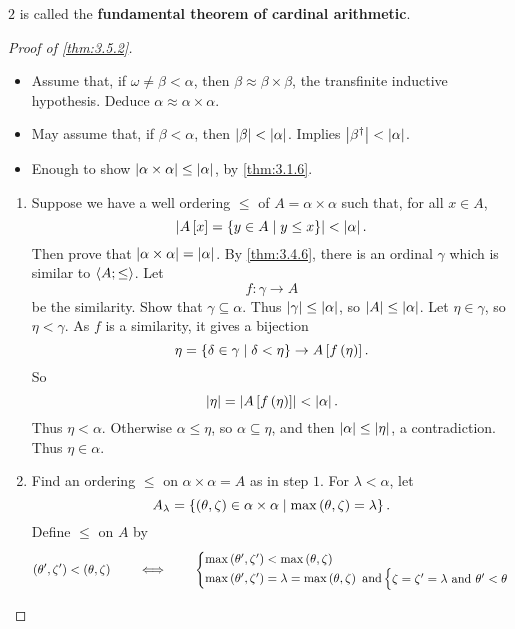 $ 2 $ is called the \textbf{fundamental theorem of cardinal arithmetic}.


\begin{proof}[Proof of \ref{thm:3.5.2}]
\hfill
\begin{itemize}
\item Assume that, if $ \omega \ne \beta < \alpha $, then $ \beta \approx \beta \times \beta $, the transfinite inductive hypothesis. Deduce $ \alpha \approx \alpha \times \alpha $.
\item May assume that, if $ \beta < \alpha $, then $ \abs{\beta} < \abs{\alpha} $. Implies $ \abs{\beta^\dagger} < \abs{\alpha} $.
\item Enough to show $ \abs{\alpha \times \alpha} \le \abs{\alpha} $, by \ref{thm:3.1.6}.
\end{itemize}
\begin{enumerate}[leftmargin=0.5in, label=Step \arabic*.]
\item Suppose we have a well ordering $ \le $ of $ A = \alpha \times \alpha $ such that, for all $ x \in A $,
$$ \abs{A\sb{x} = \cb{y \in A \mid y \le x}} < \abs{\alpha}. $$
Then prove that $ \abs{\alpha \times \alpha} = \abs{\alpha} $. By \ref{thm:3.4.6}, there is an ordinal $ \gamma $ which is similar to $ \ab{A; \le} $. Let
$$ f : \gamma \to A $$
be the similarity. Show that $ \gamma \subseteq \alpha $. Thus $ \abs{\gamma} \le \abs{\alpha} $, so $ \abs{A} \le \abs{\alpha} $. Let $ \eta \in \gamma $, so $ \eta < \gamma $. As $ f $ is a similarity, it gives a bijection
$$ \eta = \cb{\delta \in \gamma \mid \delta < \eta} \to A\sb{f\rb{\eta}}. $$
So
$$ \abs{\eta} = \abs{A\sb{f\rb{\eta}}} < \abs{\alpha}. $$
Thus $ \eta < \alpha $. Otherwise $ \alpha \le \eta $, so $ \alpha \subseteq \eta $, and then $ \abs{\alpha} \le \abs{\eta} $, a contradiction. Thus $ \eta \in \alpha $.
\item Find an ordering $ \le $ on $ \alpha \times \alpha = A $ as in step $ 1 $. For $ \lambda < \alpha $, let
$$ A_\lambda = \cb{\rb{\theta, \zeta} \in \alpha \times \alpha \mid \max\rb{\theta, \zeta} = \lambda}. $$
Define $ \le $ on $ A $ by
$$ \rb{\theta', \zeta'} < \rb{\theta, \zeta} \qquad \iff \qquad
\begin{cases}
\max\rb{\theta', \zeta'} < \max\rb{\theta, \zeta} \\
\max\rb{\theta', \zeta'} = \lambda = \max\rb{\theta, \zeta} \ \text{and}
\begin{cases}
\zeta = \zeta' = \lambda \ \text{and} \ \theta' < \theta \\

\end{cases}
\end{cases}$$
\end{enumerate}
\end{proof}
